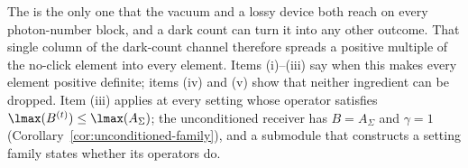 
The  is the only one that the vacuum and a lossy device
both reach on every photon-number block, and a dark count can turn it into
any other outcome. That single column of the dark-count channel therefore
spreads a positive multiple of the no-click element into every element. Items
(i)--(iii) say when this makes every element positive definite; items (iv)
and (v) show that neither ingredient can be dropped. Item (iii) applies at
every setting whose operator satisfies $\lmax(B^{(t)})\le\lmax(A_\Sigma)$;
the unconditioned receiver has $B=A_\Sigma$ and $\gamma=1$
(Corollary~\ref{cor:unconditioned-family}), and a submodule that constructs
a setting family states whether its operators do.


